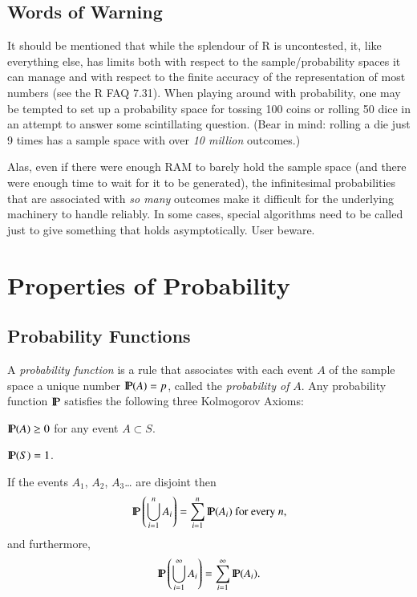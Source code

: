 \documentclass[captions=tableheading]{scrbook}
\begin{document}
\subsection{Words of Warning}
\label{sec-3-3-5}


It should be mentioned that while the splendour of \textsf{R} is uncontested,  it, like everything else, has limits both with respect to the sample/probability spaces it can manage and with respect to the finite accuracy of the representation of most numbers (see the \textsf{R} FAQ 7.31). When playing around with probability, one may be tempted to set up a probability space for tossing 100 coins or rolling 50 dice in an attempt to answer some scintillating question. (Bear in mind: rolling a die just 9 times has a sample space with over \emph{10 million} outcomes.)

Alas, even if there were enough RAM to barely hold the sample space (and there were enough time to wait for it to be generated), the infinitesimal probabilities that are associated with \emph{so many} outcomes make it difficult for the underlying machinery to handle reliably. In some cases, special algorithms need to be called just to give something
that holds asymptotically. User beware.
\section{Properties of Probability}
\label{sec-3-4}

\label{sec:Properties-of-Probability}
\subsection{Probability Functions}
\label{sec-3-4-1}

\label{sub:Probability-Functions}

A \emph{probability function} is a rule that associates with each event \(A\) of the sample space a unique number \(\P(A)=p\), called the \emph{probability of} \(A\). Any probability function \(\P\) satisfies the following three Kolmogorov Axioms: 

\begin{ax}
\label{ax:prob-nonnegative}
\(\P(A)\geq0\) for any event \(A\subset S\).
\end{ax}

\begin{ax}
\label{ax:total-mass-one}
\(\P(S)=1\).
\end{ax}

\begin{ax}
\label{ax:countable-additivity}
If the events \(A_{1}\), \(A_{2}\), \(A_{3}\)\ldots{} are disjoint then
\begin{equation}
\P\left(\bigcup_{i=1}^{n}A_{i}\right)=\sum_{i=1}^{n}\P(A_{i})\mbox{ for every }n,
\end{equation}
and furthermore,
\begin{equation}
\P\left(\bigcup_{i=1}^{\infty}A_{i}\right)=\sum_{i=1}^{\infty}\P(A_{i}).
\end{equation}
\end{ax}
\end{document}
